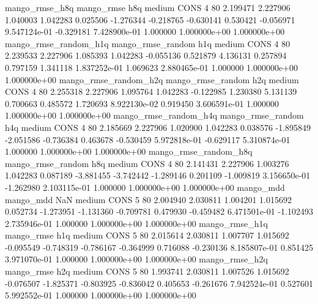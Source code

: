        mango_rmse_h8q        mango_rmse                  h8q     medium     CONS                 4 80  2.199471       2.227906 1.040003       1.042283    0.025506     -1.276344     -0.218765    -0.630141       0.530421 -0.056971 9.547124e-01    -0.329181   7.428900e-01            1.000000    1.000000e+00        1.000000e+00
mango_rmse_random_h1q mango_rmse_random                  h1q     medium     CONS                 4 80  2.239533       2.227906 1.085393       1.042283   -0.055136      0.521879      4.136131     0.257894       0.797159  1.341118 1.837252e-01     1.069623   2.880465e-01            1.000000    1.000000e+00        1.000000e+00
mango_rmse_random_h2q mango_rmse_random                  h2q     medium     CONS                 4 80  2.255318       2.227906 1.095764       1.042283   -0.122985      1.230380      5.131139     0.700663       0.485572  1.720693 8.922130e-02     0.919450   3.606591e-01            1.000000    1.000000e+00        1.000000e+00
mango_rmse_random_h4q mango_rmse_random                  h4q     medium     CONS                 4 80  2.185669       2.227906 1.020900       1.042283    0.038576     -1.895849     -2.051586    -0.736384       0.463678 -0.530459 5.972818e-01    -0.629117   5.310874e-01            1.000000    1.000000e+00        1.000000e+00
mango_rmse_random_h8q mango_rmse_random                  h8q     medium     CONS                 4 80  2.141431       2.227906 1.003276       1.042283    0.087189     -3.881455     -3.742442    -1.289146       0.201109 -1.009819 3.156650e-01    -1.262980   2.103115e-01            1.000000    1.000000e+00        1.000000e+00
            mango_mdd         mango_mdd                  NaN     medium     CONS                 5 80  2.004940       2.030811 1.004201       1.015692    0.052734     -1.273951     -1.131360    -0.709781       0.479930 -0.459482 6.471501e-01    -1.102493   2.735946e-01            1.000000    1.000000e+00        1.000000e+00
       mango_rmse_h1q        mango_rmse                  h1q     medium     CONS                 5 80  2.015614       2.030811 1.007707       1.015692   -0.095549     -0.748319     -0.786167    -0.364999       0.716088 -0.230136 8.185807e-01     0.851425   3.971070e-01            1.000000    1.000000e+00        1.000000e+00
       mango_rmse_h2q        mango_rmse                  h2q     medium     CONS                 5 80  1.993741       2.030811 1.007526       1.015692   -0.076507     -1.825371     -0.803925    -0.836042       0.405653 -0.261676 7.942524e-01     0.527601   5.992552e-01            1.000000    1.000000e+00        1.000000e+00
